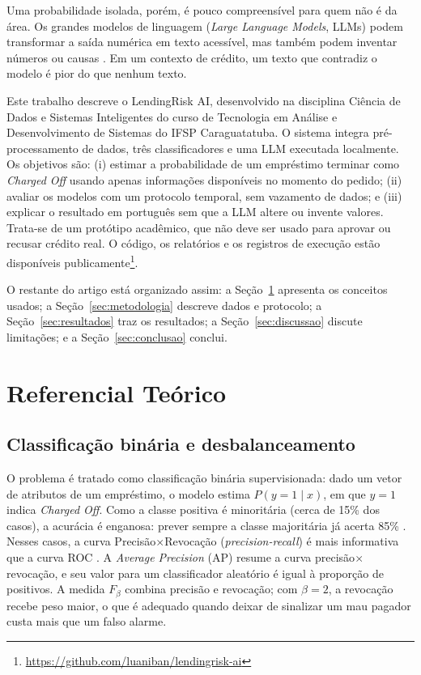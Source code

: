 \documentclass[12pt]{article}
\begin{document}
Uma probabilidade isolada, porém, é pouco compreensível para quem não é da área.
Os grandes modelos de linguagem (\textit{Large Language Models}, LLMs) podem
transformar a saída numérica em texto acessível, mas também podem inventar
números ou causas \cite{ji2023survey}. Em um contexto de crédito, um texto que
contradiz o modelo é pior do que nenhum texto.

Este trabalho descreve o LendingRisk AI, desenvolvido na disciplina Ciência de
Dados e Sistemas Inteligentes do curso de Tecnologia em Análise e
Desenvolvimento de Sistemas do IFSP Caraguatatuba. O sistema integra
pré-processamento de dados, três classificadores e uma LLM executada localmente.
Os objetivos são: (i) estimar a probabilidade de um empréstimo terminar como
\textit{Charged Off} usando apenas informações disponíveis no momento do pedido;
(ii) avaliar os modelos com um protocolo temporal, sem vazamento de dados; e
(iii) explicar o resultado em português sem que a LLM altere ou invente valores.
Trata-se de um protótipo acadêmico, que não deve ser usado para aprovar ou
recusar crédito real. O código, os relatórios e os registros de execução estão
disponíveis publicamente\footnote{\url{https://github.com/luaniban/lendingrisk-ai}}.

O restante do artigo está organizado assim: a Seção~\ref{sec:referencial}
apresenta os conceitos usados; a Seção~\ref{sec:metodologia} descreve dados e
protocolo; a Seção~\ref{sec:resultados} traz os resultados; a
Seção~\ref{sec:discussao} discute limitações; e a Seção~\ref{sec:conclusao}
conclui.


\section{Referencial Teórico}\label{sec:referencial}

\subsection{Classificação binária e desbalanceamento}

O problema é tratado como classificação binária supervisionada: dado um vetor de
atributos de um empréstimo, o modelo estima $P(y=1\mid x)$, em que $y=1$
indica \textit{Charged Off}. Como a classe positiva é minoritária (cerca de 15\%
dos casos), a acurácia é enganosa: prever sempre a classe majoritária já acerta
85\% \cite{he2009learning}. Nesses casos, a curva Precisão$\times$Revocação
(\textit{precision-recall}) é mais informativa que a curva ROC
\cite{davis2006relationship,saito2015precision}. A \textit{Average Precision}
(AP) resume a curva precisão$\times$revocação, e seu valor para um classificador
aleatório é igual à proporção de positivos. A medida $F_\beta$
\cite{vanrijsbergen1979information} combina precisão e revocação; com $\beta=2$,
a revocação recebe peso maior, o que é adequado quando deixar de sinalizar um
mau pagador custa mais que um falso alarme.
\end{document}
